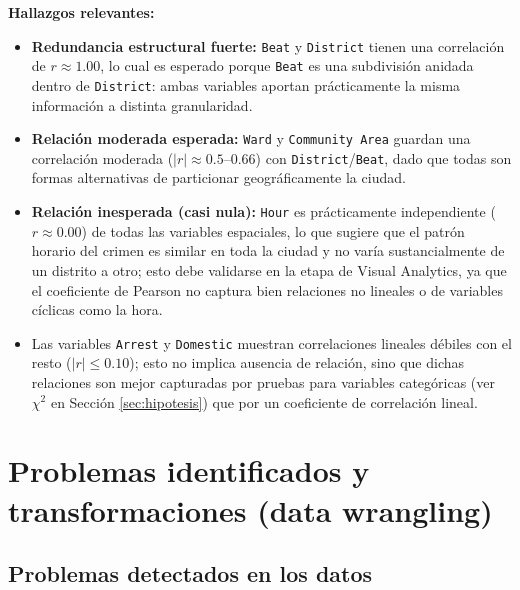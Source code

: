 \documentclass[11pt,a4paper]{article}
\begin{document}
\textbf{Hallazgos relevantes:}
\begin{itemize}
    \item \textbf{Redundancia estructural fuerte:} \texttt{Beat} y
    \texttt{District} tienen una correlación de $r \approx 1.00$, lo cual es
    esperado porque \texttt{Beat} es una subdivisión anidada dentro de
    \texttt{District}: ambas variables aportan prácticamente la misma
    información a distinta granularidad.
    \item \textbf{Relación moderada esperada:} \texttt{Ward} y
    \texttt{Community Area} guardan una correlación moderada
    ($|r|\approx 0.5$--$0.66$) con \texttt{District}/\texttt{Beat}, dado que
    todas son formas alternativas de particionar geográficamente la ciudad.
    \item \textbf{Relación inesperada (casi nula):} \texttt{Hour} es
    prácticamente independiente ($r\approx 0.00$) de todas las variables
    espaciales, lo que sugiere que el patrón horario del crimen es similar
    en toda la ciudad y no varía sustancialmente de un distrito a otro; esto
    debe validarse en la etapa de Visual Analytics, ya que el coeficiente de
    Pearson no captura bien relaciones no lineales o de variables
    cíclicas como la hora.
    \item Las variables \texttt{Arrest} y \texttt{Domestic} muestran
    correlaciones lineales débiles con el resto ($|r|\le 0.10$); esto no
    implica ausencia de relación, sino que dichas relaciones son mejor
    capturadas por pruebas para variables categóricas (ver $\chi^2$ en
    Sección \ref{sec:hipotesis}) que por un coeficiente de correlación
    lineal.
\end{itemize}

\section{Problemas identificados y transformaciones (data wrangling)}

\subsection{Problemas detectados en los datos}
\end{document}
